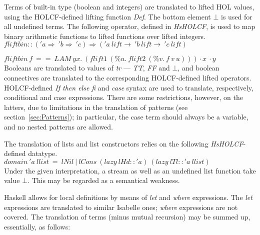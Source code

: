 \documentclass[a4paper,12pt]{article}
\begin{document}

Terms of built-in type (boolean and integers) are translated to lifted
HOL values, using the HOLCF-defined lifting function \emph{Def}.  The
bottom element $\bot$ is used for all undefined terms.  The following
operator, defined in \emph{HsHOLCF}, is used to map binary arithmetic
functions to lifted functions over
lifted integers.\\

$fliftbin :: ('a \Rightarrow \ 'b \Rightarrow \ 'c) 
  \Rightarrow ('a \ lift \to \ 'b \ lift \to \ 'c \ lift) $
 
$fliftbin \ f \ == \ LAM \ y x. \ (flift1 \ (\%u. \ flift2 \ (\%v. \ f \ v \ u))) \cdot x \ \cdot y $\\

\noindent Booleans are translated to values of \emph{tr} ---
\emph{TT}, \emph{FF} and $\bot$, and boolean connectives are
translated to the corresponding HOLCF-defined lifted operators.
HOLCF-defined \emph{If then else fi} and \emph{case} syntax are used
to translate, respectively, conditional and case expressions. There
are some restrictions, however, on the latters, due to limitations in
the translation of patterns (see section~\ref{sec:Patterns}); in
particular, the case term should always be a variable, and no nested
patterns are allowed.

The translation of lists and list constructors relies on the
following \emph{HsHOLCF}-defined datatype.\\

$domain \ 'a\ llist \ = \ lNil \ | \ lCons \ (lazy \ lHd ::'a) \ (lazy \ lTl ::'a \ llist) $\\

\noindent Under the given interpretation, a stream as well as an
undefined list function take value $\bot$. This may be regarded as a
semantical weakness.

Haskell allows for local definitions by means of \emph{let} and
\emph{where} expressions. The \emph{let} expressions are translated to
similar Isabelle ones; \emph{where} expressions are not covered. The
translation of terms (minus mutual recursion) may be summed up,
essentially, as follows:
\end{document}
